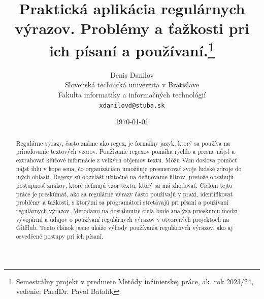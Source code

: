 \documentclass[10pt,twoside,slovak,a4paper]{article}
\title{Praktická aplikácia regulárnych výrazov. Problémy a ťažkosti pri ich písaní a používaní.\thanks{Semestrálny projekt v predmete Metódy inžinierskej práce, ak. rok 2023/24, vedenie: PaedDr. Pavol Baťalík}} %
\author{Denis Danilov\\[2pt]
	{\small Slovenská technická univerzita v Bratislave}\\
	{\small Fakulta informatiky a informačných technológií}\\
	{\small \texttt{xdanilovd@stuba.sk}}}
\date{\small \today} %
\begin{document}
\maketitle
\begin{abstract}
Regulárne výrazy, často známe ako regex, je formálny jazyk, ktorý sa používa na priraďovanie textových vzorov. Používanie regexov pomáha rýchlo a presne nájsť a extrahovať kľúčové informácie z veľkých objemov textu. Môžu Vám doslova pomôcť nájsť ihlu v kope sena, čo organizáciám umožňuje presmerovať svoje ľudské zdroje do iných oblastí. Regexy sú obzvlášť užitočné na definovanie filtrov, pretože obsahujú postupnosť znakov, ktoré definujú vzor textu, ktorý sa má zhodovať.
Cieľom tejto práce je preskúmať, ako sa regulárne výrazy často používajú v praxi, identifikovať problémy a ťažkosti, s ktorými sa programátori stretávajú pri písaní a používaní regulárnych výrazov.
Metódami na dosiahnutie cieľa bude analýza prieskumu medzi vývojármi a údajov o používaní regulárnych výrazov v otvorených projektoch na GitHub.
Tento článok jasne ukáže výhody používania regulárnych výrazov, ako aj osvedčené postupy pri ich písaní.
\end{abstract}
\end{document}
